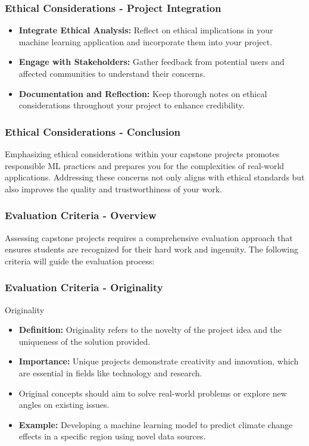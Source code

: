 \documentclass{beamer}
\begin{document}
\begin{frame}[fragile]
    \frametitle{Ethical Considerations - Project Integration}
    \begin{itemize}
        \item \textbf{Integrate Ethical Analysis:} Reflect on ethical implications in your machine learning application and incorporate them into your project.
        \item \textbf{Engage with Stakeholders:} Gather feedback from potential users and affected communities to understand their concerns.
        \item \textbf{Documentation and Reflection:} Keep thorough notes on ethical considerations throughout your project to enhance credibility.
    \end{itemize}
\end{frame}

\begin{frame}[fragile]
    \frametitle{Ethical Considerations - Conclusion}
    Emphasizing ethical considerations within your capstone projects promotes responsible ML practices and prepares you for the complexities of real-world applications. Addressing these concerns not only aligns with ethical standards but also improves the quality and trustworthiness of your work.
\end{frame}

\begin{frame}[fragile]
    \frametitle{Evaluation Criteria - Overview}
    Assessing capstone projects requires a comprehensive evaluation approach that ensures students are recognized for their hard work and ingenuity. The following criteria will guide the evaluation process:
\end{frame}

\begin{frame}[fragile]
    \frametitle{Evaluation Criteria - Originality}
    \begin{block}{Originality}
        \begin{itemize}
            \item \textbf{Definition:} Originality refers to the novelty of the project idea and the uniqueness of the solution provided.
            \item \textbf{Importance:} Unique projects demonstrate creativity and innovation, which are essential in fields like technology and research.
        \end{itemize}
    \end{block}
    \begin{itemize}
        \item Original concepts should aim to solve real-world problems or explore new angles on existing issues.
        \item \textbf{Example:} Developing a machine learning model to predict climate change effects in a specific region using novel data sources.
    \end{itemize}
\end{frame}
\end{document}
